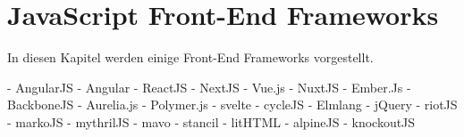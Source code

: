 \newpage
\section{JavaScript Front-End Frameworks} \label{frameworks}

In diesen Kapitel werden einige Front-End Frameworks vorgestellt.

- AngularJS
- Angular
- ReactJS
- NextJS
- Vue.js
- NuxtJS
- Ember.Js
- BackboneJS
- Aurelia.js
- Polymer.js
- svelte
- cycleJS
- Elmlang
- jQuery
- riotJS
- markoJS
- mythrilJS
- mavo
- stancil
- litHTML
- alpineJS
- knockoutJS
